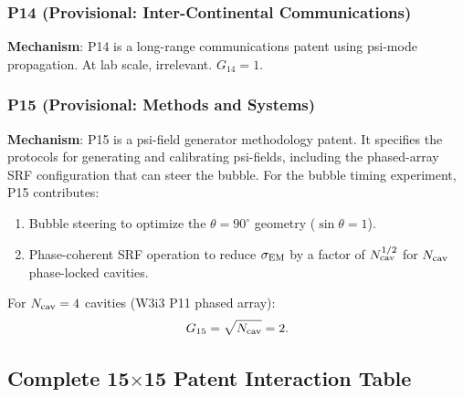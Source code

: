 \subsubsection*{P14 (Provisional: Inter-Continental Communications)}

\textbf{Mechanism}: P14 is a long-range communications patent using psi-mode
propagation. At lab scale, irrelevant. $G_{14} = 1$.

\subsubsection*{P15 (Provisional: Methods and Systems)}

\textbf{Mechanism}: P15 is a psi-field generator methodology patent. It
specifies the protocols for generating and calibrating psi-fields, including
the phased-array SRF configuration that can steer the bubble.
For the bubble timing experiment, P15 contributes:
\begin{enumerate}[nosep]
\item Bubble steering to optimize the $\theta = 90^\circ$ geometry ($\sin\theta = 1$).
\item Phase-coherent SRF operation to reduce $\sigma_{\rm EM}$ by a factor of
  $N_{\rm cav}^{1/2}$ for $N_{\rm cav}$ phase-locked cavities.
\end{enumerate}

For $N_{\rm cav} = 4$ cavities (W3i3 P11 phased array):
\begin{equation}
G_{15} = \sqrt{N_{\rm cav}} = 2.
\label{eq:G15}
\end{equation}

\subsection{Complete 15$\times$15 Patent Interaction Table}
\label{ssec:full_matrix}

